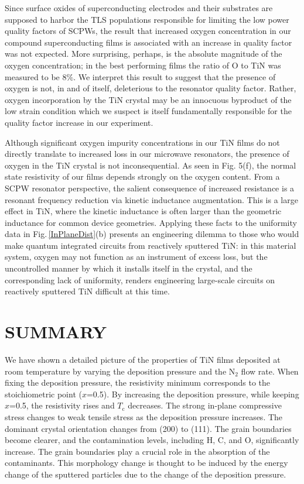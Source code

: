 Since surface oxides of superconducting electrodes and their substrates are supposed to harbor the TLS populations\cite{Gao2008} responsible for limiting the low power quality factors of SCPWs, the result that increased oxygen concentration in our compound superconducting films is associated with an increase in quality factor was not expected.  More surprising, perhaps, is the absolute magnitude of the oxygen concentration; in the best performing films the ratio of O to TiN was measured to be 8$\%$.  We interpret this result to suggest that the presence of oxygen is not, in and of itself, deleterious to the resonator quality factor.  Rather, oxygen incorporation by the TiN crystal may be an innocuous byproduct of the low strain condition which we suspect is itself fundamentally responsible for the quality factor increase in our experiment.

Although significant oxygen impurity concentrations in our TiN films do not directly translate to increased loss in our microwave resonators, the presence of oxygen in the TiN crystal is not inconsequential.  As seen in Fig. 5(f), the normal state resistivity of our films depends strongly on the oxygen content.  From a SCPW resonator perspective, the salient consequence of increased resistance is a resonant frequency reduction via kinetic inductance augmentation.  This is a large effect in TiN, where the kinetic inductance is often larger than the geometric inductance for common device geometries.  Applying these facts to the uniformity data in Fig.\,\ref{InPlaneDist}(b)  presents an engineering dilemma to those who would make quantum integrated circuits from reactively sputtered TiN: in this material system, oxygen may not function as an instrument of excess loss, but the uncontrolled manner by which it installs itself in the crystal, and the corresponding lack of uniformity, renders engineering large-scale circuits on reactively sputtered TiN difficult at this time.								

\section{SUMMARY}
We have shown a detailed picture of the properties of TiN films deposited at room temperature by varying the deposition pressure and the N$_{2}$ flow rate. When fixing the deposition pressure, the resistivity minimum corresponds to the stoichiometric point ($x$=0.5). By increasing the deposition pressure, while keeping $x$=0.5, the resistivity rises and $T_{\text{c}}$ decreases. The strong in-plane compressive stress changes to weak tensile stress as the deposition pressure increases. The dominant crystal orientation changes from (200) to (111). The grain boundaries become clearer, and the contamination levels, including H, C, and O, significantly increase. The grain boundaries play a crucial role in the absorption of the contaminants. This morphology change is thought to be induced by the energy change of the sputtered particles due to the change of the deposition pressure.

